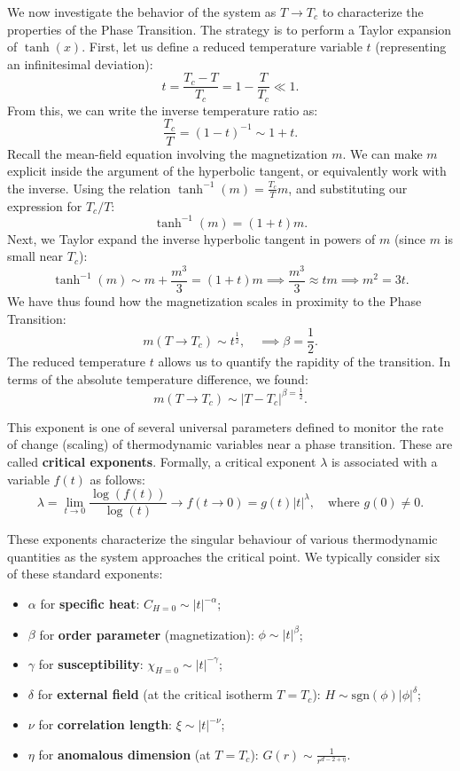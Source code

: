 We now investigate the behavior of the system as \(T \to T_c\) to characterize the properties of the Phase Transition. The strategy is to perform a Taylor expansion of \(\tanh(x)\). First, let us define a reduced temperature variable \(t\) (representing an infinitesimal deviation):
\begin{equation}
    t = \frac{T_c - T}{T_c} = 1-\frac{T}{T_c} \ll 1.
    \label{eq:reduced_temperature}
\end{equation}
From this, we can write the inverse temperature ratio as:
\[
    \frac{T_c}{T} = (1-t)^{-1} \sim 1 + t.
\]
Recall the mean-field equation involving the magnetization \(m\). We can make \(m\) explicit inside the argument of the hyperbolic tangent, or equivalently work with the inverse. Using the relation \(\tanh^{-1}(m) = \frac{T_c}{T} m\), and substituting our expression for \(T_c/T\):
\[
    \tanh^{-1}(m) = (1+t)m.
\]
Next, we Taylor expand the inverse hyperbolic tangent in powers of \(m\) (since \(m\) is small near \(T_c\)):
\[
    \tanh^{-1}(m) \sim m + \frac{m^3}{3} = (1+t)m \implies \frac{m^3}{3} \approx tm \implies m^2 = 3t.
\]
We have thus found how the magnetization scales in proximity to the Phase Transition:
\[
    m(T \to T_c) \sim t^{\tfrac12}, \quad \implies \beta=\frac{1}{2}.
\]
The reduced temperature \(t\) allows us to quantify the rapidity of the transition. In terms of the absolute temperature difference, we found:
\[
    m(T \to T_c) \sim \vert T - T_c \vert^{\beta = \tfrac12}.
\]

This exponent is one of several universal parameters defined to monitor the rate of change (scaling) of thermodynamic variables near a phase transition. These are called \textbf{critical exponents}. Formally, a critical exponent \(\lambda\) is associated with a variable \(f(t)\) as follows:
\begin{equation}
    \lambda = \lim_{t \to 0} \frac{\log(f(t))}{\log(t)} \longrightarrow f(t \to 0) = g(t)\vert t \vert^{\lambda}, \quad \text{where } g(0) \neq 0.
    \label{eq:critical_exponent_definition}
\end{equation}

These exponents characterize the singular behaviour of various thermodynamic quantities as the system approaches the critical point.
We typically consider six of these standard exponents:
\begin{itemize}
    \item \(\alpha\) for \textbf{specific heat}: \(C_{H=0} \sim \vert t \vert^{-\alpha}\);
    \item \(\beta\) for \textbf{order parameter} (magnetization): \(\phi \sim \vert t \vert^{\beta}\);
    \item \(\gamma\) for \textbf{susceptibility}: \(\chi_{H=0} \sim \vert t \vert^{-\gamma}\);
    \item \(\delta\) for \textbf{external field} (at the critical isotherm \(T=T_c\)): \(H \sim \mathrm{sgn}(\phi)\vert \phi \vert^{\delta}\);
    \item \(\nu\) for \textbf{correlation length}: \(\xi \sim \vert t \vert^{-\nu}\);
    \item \(\eta\) for \textbf{anomalous dimension} (at \(T=T_c\)): \(G(r) \sim \frac{1}{r^{d-2+\eta}}\).
\end{itemize}

